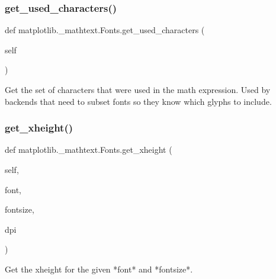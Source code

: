 \subsubsection{\texorpdfstring{get\+\_\+used\+\_\+characters()}{get\_used\_characters()}}
{\footnotesize\ttfamily def matplotlib.\+\_\+mathtext.\+Fonts.\+get\+\_\+used\+\_\+characters (\begin{DoxyParamCaption}\item[{}]{self }\end{DoxyParamCaption})}

\begin{DoxyVerb}Get the set of characters that were used in the math
expression.  Used by backends that need to subset fonts so
they know which glyphs to include.
\end{DoxyVerb}
 \mbox{\label{classmatplotlib_1_1__mathtext_1_1Fonts_a24d7cef0a8450b137999c232d78a2c6e}} 
\subsubsection{\texorpdfstring{get\+\_\+xheight()}{get\_xheight()}}
{\footnotesize\ttfamily def matplotlib.\+\_\+mathtext.\+Fonts.\+get\+\_\+xheight (\begin{DoxyParamCaption}\item[{}]{self,  }\item[{}]{font,  }\item[{}]{fontsize,  }\item[{}]{dpi }\end{DoxyParamCaption})}

\begin{DoxyVerb}Get the xheight for the given *font* and *fontsize*.
\end{DoxyVerb}
 \mbox{\label{classmatplotlib_1_1__mathtext_1_1Fonts_aed988318d92997e165675879a068e51b}} 
